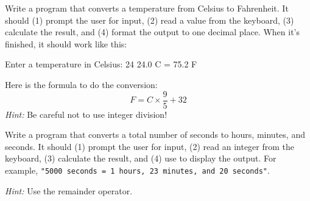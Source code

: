 \begin{exercise}  %

Write a program that converts a temperature from Celsius to Fahrenheit.
It should (1) prompt the user for input, (2) read a  value from the keyboard, (3) calculate the result, and (4) format the output to one decimal place.
When it's finished, it should work like this:

\begin{stdout}
Enter a temperature in Celsius: 24
24.0 C = 75.2 F
\end{stdout}

Here is the formula to do the conversion:
%
\[ F = C \times \frac{9}{5} + 32 \]
%
{\em Hint:} Be careful not to use integer division!

\end{exercise}


\begin{exercise}  %

Write a program that converts a total number of seconds to hours, minutes, and seconds.
It should (1) prompt the user for input, (2) read an integer from the keyboard, (3) calculate the result, and (4) use  to display the output.
For example, {\tt "5000 seconds = 1 hours, 23 minutes, and 20 seconds"}.

{\em Hint:} Use the remainder operator.

\end{exercise}

